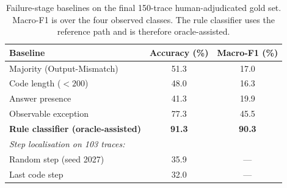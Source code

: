 \begin{table}[t]
\centering
\caption{Failure-stage baselines on the final 150-trace human-adjudicated gold set. Macro-F1 is over the four observed classes. The rule classifier uses the reference path and is therefore oracle-assisted.}
\label{tab:baselines-classification}
\small
\begin{tabular}{@{}lcc@{}}
\toprule
Baseline & Accuracy (\%) & Macro-F1 (\%) \\
\midrule
Majority (Output-Mismatch) & 51.3 & 17.0 \\
Code length ($<200$) & 48.0 & 16.3 \\
Answer presence & 41.3 & 19.9 \\
Observable exception & 77.3 & 45.5 \\
\textbf{Rule classifier (oracle-assisted)} & \textbf{91.3} & \textbf{90.3} \\
\midrule
\multicolumn{3}{l}{\textit{Step localisation on 103 traces:}} \\
Random step (seed 2027) & 35.9 & --- \\
Last code step & 32.0 & --- \\
\bottomrule
\end{tabular}
\end{table}
